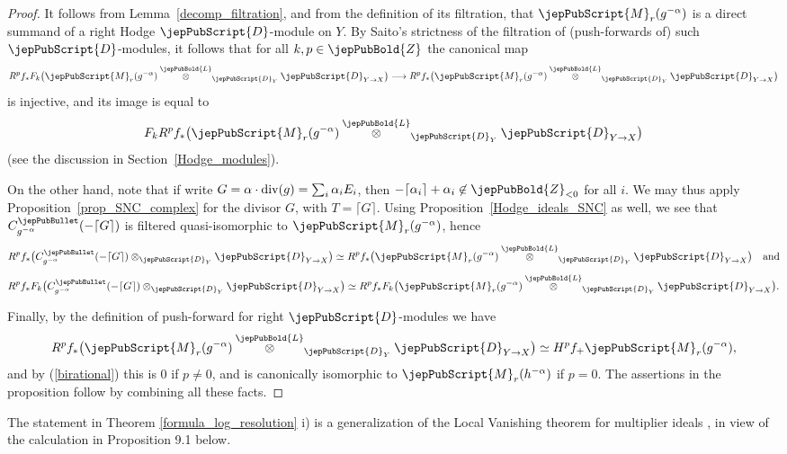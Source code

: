 \begin{proof}
It follows from Lemma~\ref{decomp_filtration}, and from the definition of its filtration, that $\jepPubScript{M}_r(g^{-\alpha})$ is 
a direct summand of a right Hodge $\jepPubScript{D}$-module on $Y$. By Saito's strictness of the filtration of (push-forwards of) such $\jepPubScript{D}$-modules, it follows that for all $k,p\in\jepPubBold{Z}$ the canonical map
$$R^pf_*F_k\big(\jepPubScript{M}_r(g^{-\alpha})\overset{\jepPubBold{L}}{\otimes}_{\jepPubScript{D}_Y}\jepPubScript{D}_{Y\to X}\big)\longrightarrow R^pf_*\big(\jepPubScript{M}_r(g^{-\alpha})\overset{\jepPubBold{L}}{\otimes}_{\jepPubScript{D}_Y}\jepPubScript{D}_{Y\to X}\big)$$
is injective, and its image is equal to
$$F_kR^pf_*\big(\jepPubScript{M}_r(g^{-\alpha})\overset{\jepPubBold{L}}{\otimes}_{\jepPubScript{D}_Y}\jepPubScript{D}_{Y\to X}\big)$$
(see the discussion in Section~\ref{Hodge_modules}).

On the other hand, note that if write 
$G=\alpha\cdot {\rm div}(g)=\sum_i\alpha_iE_i$, then $-\lceil\alpha_i\rceil+\alpha_i\not\in\jepPubBold{Z}_{<0}$ for all $i$.
We may thus apply Proposition~\ref{prop_SNC_complex} for the divisor $G$, with $T=\lceil G\rceil$.
Using Proposition~\ref{Hodge_ideals_SNC} as well,
we see that $C^{\jepPubBullet}_{g^{-\alpha}}(-\lceil G\rceil)$ is filtered quasi-isomorphic to
$\jepPubScript{M}_r(g^{-\alpha})$, hence 
$$R^pf_*\big(C^{\jepPubBullet}_{g^{-\alpha}}(-\lceil G\rceil)\otimes_{\jepPubScript{D}_Y}\jepPubScript{D}_{Y\to X}\big)\simeq R^pf_*\big(\jepPubScript{M}_r(g^{-\alpha})\overset{\jepPubBold{L}}{\otimes}_{\jepPubScript{D}_Y}\jepPubScript{D}_{Y\to X}\big)\quad\text{and}$$
$$R^pf_*F_k\big(C^{\jepPubBullet}_{g^{-\alpha}}(-\lceil G\rceil)\otimes_{\jepPubScript{D}_Y}\jepPubScript{D}_{Y\to X}\big)\simeq 
R^pf_*F_k\big(\jepPubScript{M}_r(g^{-\alpha})\overset{\jepPubBold{L}}{\otimes}_{\jepPubScript{D}_Y}\jepPubScript{D}_{Y\to X}\big).$$

Finally, by the definition of push-forward for right $\jepPubScript{D}$-modules we have
$$R^pf_*\big(\jepPubScript{M}_r(g^{-\alpha})\overset{\jepPubBold{L}}{\otimes}_{\jepPubScript{D}_Y}\jepPubScript{D}_{Y\to X}\big)\simeq 
H^pf_+\jepPubScript{M}_r(g^{-\alpha}),$$
and by (\ref{birational}) this is $0$ if $p\neq 0$, and is canonically isomorphic to $\jepPubScript{M}_r (h^{-\alpha})$ if $p=0$. 
The assertions in the proposition follow by combining all these facts.
\end{proof}
 
\begin{remark}
The statement in Theorem \ref{formula_log_resolution} i) is a generalization of the Local Vanishing theorem 
for multiplier ideals \cite[Th. 9.4.1]{Lazarsfeld}, in view of the calculation in Proposition 9.1 below.
\end{remark}





